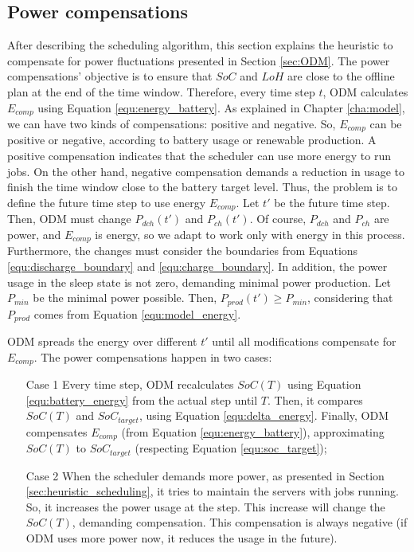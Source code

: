 \subsection{Power compensations}
\label{sec:power_compensation}

After describing the scheduling algorithm, this section explains the heuristic to compensate for power fluctuations presented in Section \ref{sec:ODM}. The power compensations' objective is to ensure that $SoC$ and $LoH$ are close to the offline plan at the end of the time window. Therefore, every time step $t$, ODM calculates $E_{comp}$ using Equation \ref{equ:energy_battery}. As explained in Chapter \ref{cha:model}, we can have two kinds of compensations: positive and negative. So, $E_{comp}$ can be positive or negative, according to battery usage or renewable production. A positive compensation indicates that the scheduler can use more energy to run jobs. On the other hand, negative compensation demands a reduction in usage to finish the time window close to the battery target level. Thus, the problem is to define the future time step to use energy $E_{comp}$. Let $t'$ be the future time step. Then, ODM must change $P_{dch}(t')$ and $P_{ch}(t')$. Of course, $P_{dch}$ and $P_{ch}$ are power, and $E_{comp}$ is energy, so we adapt to work only with energy in this process. Furthermore, the changes must consider the boundaries from Equations \ref{equ:discharge_boundary} and \ref{equ:charge_boundary}. In addition, the power usage in the sleep state is not zero, demanding minimal power production. Let $P_{min}$ be the minimal power possible. Then, $P_{prod}(t') \ge P_{min}$, considering that $P_{prod}$ comes from Equation \ref{equ:model_energy}. 

ODM spreads the energy over different $t'$ until all modifications compensate for $E_{comp}$. The power compensations happen in two cases:
\begin{itemize}[leftmargin=.6in]
    \item[Case 1] Every time step, ODM recalculates $SoC(T)$ using Equation \ref{equ:battery_energy} from the actual step until $T$. Then, it compares $SoC(T)$ and $SoC_{target}$, using Equation \ref{equ:delta_energy}. Finally, ODM compensates $E_{comp}$ (from Equation \ref{equ:energy_battery}), approximating $SoC(T)$ to $SoC_{target}$ (respecting Equation \ref{equ:soc_target});
    \item[Case 2] When the scheduler demands more power, as presented in Section \ref{sec:heuristic_scheduling}, it tries to maintain the servers with jobs running. So, it increases the power usage at the step. This increase will change the $SoC(T)$, demanding compensation. This compensation is always negative (if ODM uses more power now, it reduces the usage in the future).
\end{itemize}

